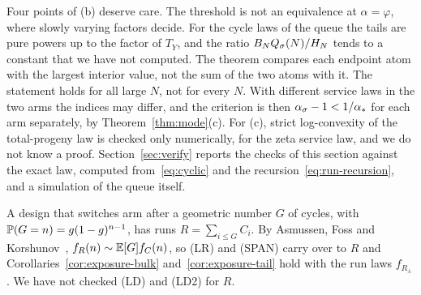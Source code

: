 Four points of (b) deserve care. The threshold is not an equivalence at $\alpha=\varphi$,
where slowly varying factors decide. For the cycle laws of the queue the tails are pure
powers up to the factor of $T_Y$, and the ratio $B_NQ_\sigma(N)/H_N$ tends to a constant that
we have not computed. The theorem compares each endpoint atom with the largest interior
value, not the sum of the two atoms with it. The statement holds for all large $N$, not for
every $N$. With different service laws in the two arms the indices may differ, and the
criterion is then $\alpha_\sigma-1<1/\alpha_*$ for each arm separately, by
Theorem~\ref{thm:mode}(c). For (c), strict log-convexity of the total-progeny law is
checked only numerically, for the zeta service law, and we do not know a proof.
Section~\ref{sec:verify} reports the checks of this section against the exact law, computed
from~\eqref{eq:cyclic} and the recursion~\eqref{eq:run-recursion}, and a simulation of the
queue itself.

\ifarxivbuild
\begin{remark}\label{rem:geometric-cycles}
A design that switches arm after a geometric number $G$ of cycles, with
$\mathbb{P}(G=n)=g(1-g)^{n-1}$, has runs $R=\sum_{i\le G}C_i$. By Asmussen, Foss and
Korshunov~\cite[Theorem~2(i) and Remark~3]{afk2003}, $f_R(n)\sim\mathbb{E}[G]f_C(n)$, so (LR) and (SPAN)
carry over to $R$ and Corollaries~\ref{cor:exposure-bulk} and~\ref{cor:exposure-tail} hold with
the run laws $f_{R_\pm}$. We have not checked (LD) and (LD2) for $R$.
\end{remark}
\fi
